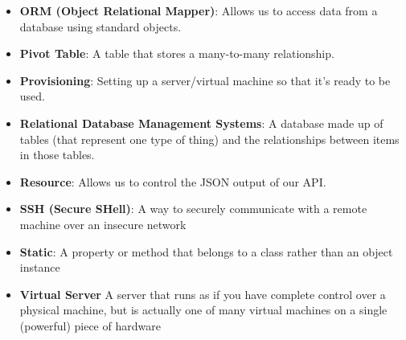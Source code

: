 \begin{itemize}[leftmargin=*]
    \item
        \textbf{ORM (Object Relational Mapper)}:
        Allows us to access data from a database using standard objects.
    \item
        \textbf{Pivot Table}:
        A table that stores a many-to-many relationship.
    \item
        \textbf{Provisioning}:
        Setting up a server/virtual machine so that it's ready to be used.
    \item
        \textbf{Relational Database Management Systems}:
        A database made up of tables (that represent one type of thing) and the relationships between items in those tables.
    \item
        \textbf{Resource}:
        Allows us to control the JSON output of our API.
    \item
        \textbf{SSH (Secure SHell)}:
        A way to securely communicate with a remote machine over an insecure network
    \item
        \textbf{Static}:
        A property or method that belongs to a class rather than an object instance
    \item
        \textbf{Virtual Server}
        A server that runs as if you have complete control over a physical machine, but is actually one of many virtual machines on a single (powerful) piece of hardware
\end{itemize}
